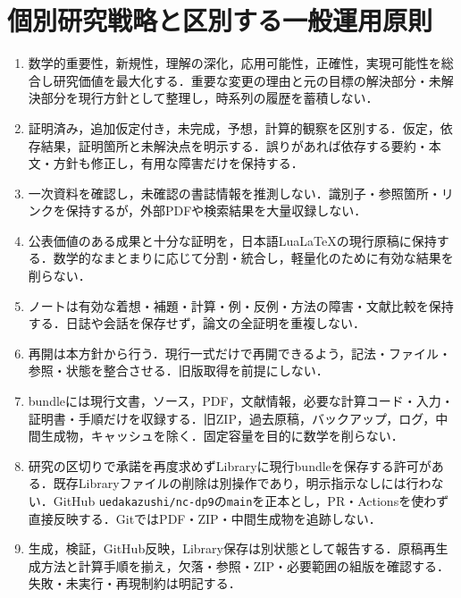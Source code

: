 \documentclass[11pt,a4paper]{ltjsarticle}
\begin{document}
\section{個別研究戦略と区別する一般運用原則}
\begin{enumerate}
\item 数学的重要性，新規性，理解の深化，応用可能性，正確性，実現可能性を総合し研究価値を最大化する．重要な変更の理由と元の目標の解決部分・未解決部分を現行方針として整理し，時系列の履歴を蓄積しない．
\item 証明済み，追加仮定付き，未完成，予想，計算的観察を区別する．仮定，依存結果，証明箇所と未解決点を明示する．誤りがあれば依存する要約・本文・方針も修正し，有用な障害だけを保持する．
\item 一次資料を確認し，未確認の書誌情報を推測しない．識別子・参照箇所・リンクを保持するが，外部PDFや検索結果を大量収録しない．
\item 公表価値のある成果と十分な証明を，日本語LuaLaTeXの現行原稿に保持する．数学的なまとまりに応じて分割・統合し，軽量化のために有効な結果を削らない．
\item ノートは有効な着想・補題・計算・例・反例・方法の障害・文献比較を保持する．日誌や会話を保存せず，論文の全証明を重複しない．
\item 再開は本方針から行う．現行一式だけで再開できるよう，記法・ファイル・参照・状態を整合させる．旧版取得を前提にしない．
\item bundleには現行文書，ソース，PDF，文献情報，必要な計算コード・入力・証明書・手順だけを収録する．旧ZIP，過去原稿，バックアップ，ログ，中間生成物，キャッシュを除く．固定容量を目的に数学を削らない．
\item 研究の区切りで承諾を再度求めずLibraryに現行bundleを保存する許可がある．既存Libraryファイルの削除は別操作であり，明示指示なしには行わない．GitHub \texttt{uedakazushi/nc-dp9}の\texttt{main}を正本とし，PR・Actionsを使わず直接反映する．GitではPDF・ZIP・中間生成物を追跡しない．
\item 生成，検証，GitHub反映，Library保存は別状態として報告する．原稿再生成方法と計算手順を揃え，欠落・参照・ZIP・必要範囲の組版を確認する．失敗・未実行・再現制約は明記する．
\end{enumerate}
\endgroup
\end{document}
